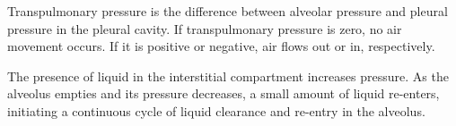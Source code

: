 Transpulmonary pressure is the difference between alveolar pressure
and pleural pressure in the pleural cavity. If transpulmonary pressure
is zero, no air movement occurs. If it is positive or negative, air
flows out or in, respectively.

The presence of liquid in the interstitial compartment increases
pressure. As the alveolus empties and its pressure decreases, a small
amount of liquid re-enters, initiating a continuous cycle of liquid
clearance and re-entry in the alveolus.









